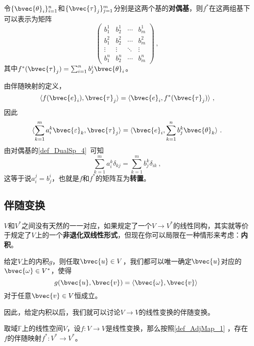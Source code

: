 令$\{\bvec{\theta}_i\}_{i=1}^n$和$\{\bvec{\tau}_j\}_{j=1}^m$分别是这两个基的\textbf{对偶基}，则$f^*$在这两组基下可以表示为矩阵
\begin{equation}
\begin{pmatrix}
b^1_1&b^1_2&\cdots&b^1_m\\
b^2_1&b^2_2&\cdots&b^2_m\\
\vdots&\vdots&\ddots&\vdots\\
b^n_1&b^n_2&\cdots&b^n_m
\end{pmatrix}~, 
\end{equation}
其中$f^*(\bvec{\tau}_j)=\sum_{i=1}^n b^i_j\bvec{\theta}_i$。

由伴随映射的定义，
\begin{equation}
\langle f(\bvec{e}_i), \bvec{\tau}_j \rangle =\langle \bvec{e}_i, f^*(\bvec{\tau}_j) \rangle ~, 
\end{equation}
因此
\begin{equation}
\langle \sum_{k=1}^m a^k_i\bvec{\varepsilon}_k, \bvec{\tau}_j \rangle =\langle \bvec{e}_i, \sum_{k=1}^n b^k_j\bvec{\theta}_k \rangle ~. 
\end{equation}
由对偶基的\autoref{def_DualSp_4}~可知
\begin{equation}
\sum_{k=1}^m a^k_i\delta_{kj} = \sum_{k=1}^m b^k_j\delta_{ik}~, 
\end{equation}
这等于说$a^j_i=b^i_j$，也就是$f$和$f^*$的矩阵互为\textbf{转置}。






\subsection{伴随变换}



$V$和$V^*$之间没有天然的一一对应，如果规定了一个$V\to V^*$的线性同构，其实就等价于规定了$V$上的一个\textbf{非退化双线性形式}，但现在你可以局限在一种情形来考虑：\textbf{内积}。

给定$V$上的内积$g$，则任取$\bvec{u}\in V$，我们都可以唯一确定$\bvec{u}$对应的$\bvec{\omega}\in V^*$，使得
\begin{equation}
g(\bvec{u}, \bvec{v}) = \langle \bvec{\omega}, \bvec{v} \rangle~
\end{equation}
对于任意$\bvec{v}\in V$恒成立。

因此，给定内积以后，我们就可以讨论$V\to V$的线性变换的伴随变换。


取域$\mathbb{F}$上的线性空间$V$，设$f:V\to V$是线性变换，那么按照\autoref{def_AdjMap_1} ，存在$f$的伴随映射$f^*:V^*\to V^*$。























